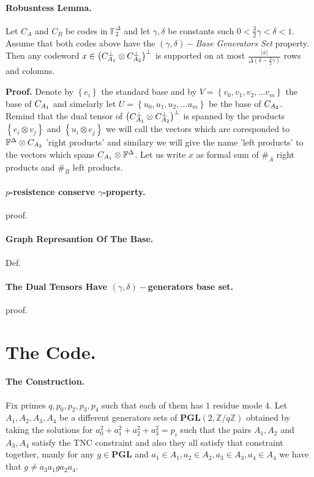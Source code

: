 \documentclass{article}
\begin{document}
\begin{multicols*}{2}
	\paragraph{Robusntess Lemma.} Let $C_{A}$ and $C_{B}$ be codes in $\mathbb{F}^{\Delta}_{2}$ and let $\gamma,\delta$ be constants such $0 < \frac{3}{2}\gamma < \delta < 1$. Assume that both codes above have the $\left( \gamma,\delta \right)-$\textit{Base Generators Set} property. Then any codeword $x\in \left( C_{A_{1}}^{\perp} \otimes C_{A_{2}}^{\perp} \right)^\perp$ is supported on at most $\frac{|x|}{\Delta\left( \delta-\frac{3}{2}\gamma \right)} $ rows and colomns.     

	\textbf{Proof.} Denote by $\left\{ e_{i} \right\}$ the standard base and by $ V = \left\{v_{0},v_{1},v_{2},\dots v_{m}  \right\} $ the base of $C_{A_{1}}$ and simelarly let $U = \left\{u_{0},u_{1},u_{2},\dots u_{m}   \right\} $ be the base of $C_{A_{2}}$. 
	Remind that the dual tensor of $\left( C_{A_{1}}^{\perp} \otimes C_{A_{2}}^{\perp} \right)^\perp$ is spanned by the products $ \left\{ e_{i}\otimes v_{j} \right\} $ and $\left\{ u_{i}\otimes e_{j} \right\}$ we will call the vectors which are coresponded to $\mathbb{F}^{\Delta} \otimes C_{A_{2}}$ 'right products' and similary we will give the name 'left products' to the vectors which spans $C_{A_{1}} \otimes \mathbb{F}^{\Delta}$. 
	Let us write $x$ as formal sum of $\#_{A}$ right products and $\#_{B}$ left products. 
	\paragraph{$p$-resistence conserve $\gamma$-property. } proof. 
	\paragraph{Graph Represantion Of The Base. } Def. 
	\paragraph{The Dual Tensors Have $\left( \gamma,\delta \right)-$generators base set.} proof.
	\section{The Code.}
 \paragraph{The Construction.} Fix primes $q,p_0,p_2,p_3,p_4$ such that each of them has $1 $ residue mode $4$. Let $A_{1},A_{2},A_{3},A_{4}$ be a different generators sets of $ \mathbf{PGL}(2 , \mathbb{Z} / q\mathbb{Z} )  $ 
  obtained by taking the solutions for $a_{0}^{2} + a_{1}^{2} +a_{2}^{2} +a_{3}^{2} = p_i $ such that the pairs $A_{1},A_{2}$ and $A_{3},A_{4}$ satisfy the 
  TNC constraint and also they all satisfy that constraint together, manly for any $g \in \mathbf{PGL}$  and $a_{1}\in A_{1}, a_{2} \in A_{2}, a_{3} \in A_{3}, a_{4} \in A_{4}$ we have that $ g \neq a_{3}a_{1}ga_{2}a_{4}$. 
  

\end{multicols*}
\end{document}
